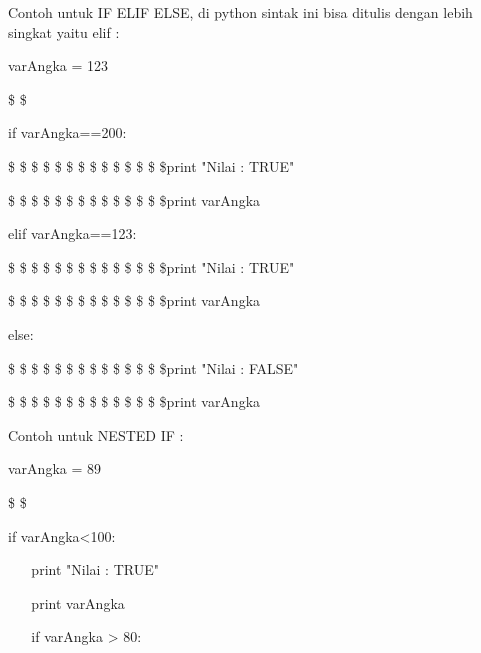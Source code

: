 Contoh untuk IF ELIF ELSE, di python sintak ini bisa ditulis dengan lebih singkat yaitu elif :  \par
\vspace{12pt}
\noindent 
varAngka = 123 \par
\noindent 
 \$  \$ \par
\noindent 
if varAngka==200: \par
\vspace{12pt}
\noindent 
 \$  \$  \$  \$  \$  \$  \$  \$  \$  \$  \$  \$  \$  \$print "Nilai : TRUE" \par
\vspace{12pt}
\noindent 
 \$  \$  \$  \$  \$  \$  \$  \$  \$  \$  \$  \$  \$  \$print varAngka \par
\vspace{12pt}
\noindent 
elif varAngka==123: \par
\vspace{12pt}
\noindent 
 \$  \$  \$  \$  \$  \$  \$  \$  \$  \$  \$  \$  \$  \$print "Nilai : TRUE" \par
\vspace{12pt}
\noindent 
 \$  \$  \$  \$  \$  \$  \$  \$  \$  \$  \$  \$  \$  \$print varAngka \par
\vspace{12pt}
\noindent 
else: \par
\vspace{12pt}
\noindent 
 \$  \$  \$  \$  \$  \$  \$  \$  \$  \$  \$  \$  \$  \$print "Nilai : FALSE" \par
\vspace{12pt}
\noindent 
 \$  \$  \$  \$  \$  \$  \$  \$  \$  \$  \$  \$  \$  \$print varAngka \par
\vspace{12pt}
\noindent 
Contoh untuk NESTED IF :  \par
\vspace{12pt}
\noindent 
varAngka = 89 \par
\noindent 
 \$  \$ \par
\noindent 
if varAngka<100: \par
\vspace{12pt}
\noindent 
 $  $  $  $  $  $  $  $  $  $  $  $print "Nilai : TRUE" \par
\vspace{12pt}
\noindent 
 $  $  $  $  $  $  $  $  $  $  $  $print varAngka \par
\vspace{12pt}
\noindent 
 $  $  $  $  $  $  $  $  $  $  $  $if varAngka > 80: \par
